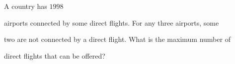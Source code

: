 A country has $ 1998$

 airports connected by some direct flights. For any three airports, some

 two are not connected by a direct flight. What is the maximum number of

 direct flights that can be offered?
